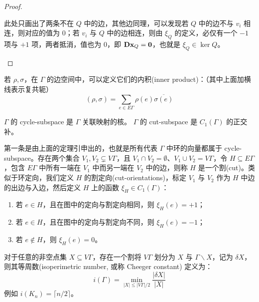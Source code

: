 \begin{proof}
\begin{enumerate}
\begin{center}
\begin{tikzpicture}[node distance = 1.5 cm]
  \end{tikzpicture}
\end{center}
此处只画出了两条不在 $Q$ 中的边，其他边同理，可以发现若 $Q$ 中的边不与 $v_i$ 相连，则对应的值为 $0$；若 $v_i$ 与 $Q$ 中的边相连，则由 $\xi_Q$ 的定义，必仅有一个 $-1$ 项与 $+1$ 项，两者抵消，值也为 $0$，即 $\textbf {Dx}_Q = \textbf 0$，也就是 $\xi_Q \in \ker Q$。
\end{enumerate}
\end{proof}

若 $\rho, \sigma$，在 $\Gamma$ 的边空间中，可以定义它们的内积(inner product)：（其中上面加横线表示复共轭）
\[
(\rho, \sigma) = \sum_{e \in E\Gamma} \rho(e) \overline{\sigma(e)}
\]

\begin{definition}
$\Gamma$ 的 cycle-subspace 是 $\Gamma$ 关联映射的核。
$\Gamma$ 的 cut-subspace 是 $C_1(\Gamma)$ 的正交补。
\end{definition}

第一条是由上面的定理引申出的，也就是所有代表 $\Gamma$ 中环的向量都属于 cycle-subspace。存在两个集合 $V_1, V_2 \subsetneq V\Gamma$，且 $V_1 \cap V_2 = \emptyset$、$V_1 \cup V_2 = V\Gamma$，令 $H \subseteq E\Gamma$，包含 $E\Gamma$ 中所有一端在 $V_1$ 中而另一端在 $V_2$ 中的边，则称 $H$ 是一个割(cut)。类似于环定向，我们定义 $H$ 的割定向(cut-orientations)，标定 $V_1$ 与 $V_2$ 作为 $H$ 中边的出边与入边，然后定义 $H$ 上的函数 $\xi_{H} \in C_1(\Gamma)$：
\begin{enumerate}
\item 若 $e\in H$，且在图中的定向与割定向相同，则 $\xi_H(e) = +1$；
\item 若 $e\in H$，且在图中的定向与割定向不同，则 $\xi_H(e) = -1$；
\item 若 $e\notin H$，则 $\xi_H(e) = 0$。
\end{enumerate}

\begin{definition}[等周数]
对于任意的非空点集 $X \subseteq V\Gamma$，存在一个割将 $V\Gamma$ 划分为 $X$ 与 $\Gamma \backslash X$，记为 $\delta X$，则其等周数(isoperimetric number, 或称 Cheeger constant) 定义为：
\[
i(\Gamma)=\min _{|X| \leq|V \Gamma| / 2} \frac{|\delta X|}{|X|}
\]
例如 $i(K_n) = \lceil n / 2\rceil$。
\end{definition}

